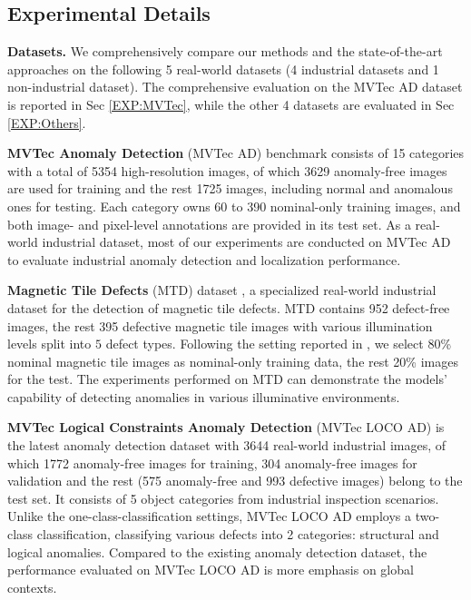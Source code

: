 \documentclass[default,iicol]{sn-jnl}\usepackage[algo2e,ruled,linesnumbered]{algorithm2e}
\theoremstyle{thmstyleone}\newtheorem{theorem}{Theorem}\newtheorem{proposition}[theorem]{Proposition}
\theoremstyle{thmstyletwo}\newtheorem{example}{Example}\newtheorem{remark}{Remark}
\theoremstyle{thmstylethree}\newtheorem{definition}{Definition}
\begin{document}
\subsection{Experimental Details}

\noindent\textbf{Datasets. }\label{sec:dataset}
We comprehensively compare our methods and the state-of-the-art approaches on the following 5 real-world datasets (4 industrial datasets and 1 non-industrial dataset).
The comprehensive evaluation on the MVTec AD dataset is reported in Sec \ref{EXP:MVTec}, while the other 4 datasets are evaluated in Sec \ref{EXP:Others}.

\textbf{MVTec Anomaly Detection} (MVTec AD) benchmark \cite{MVTEC} consists of 15 categories with a total of 5354 high-resolution images, of which 3629 anomaly-free images are used for training and the rest 1725 images, including normal and anomalous ones for testing.
Each category owns 60 to 390 nominal-only training images, and both image- and pixel-level annotations are provided in its test set.
As a real-world industrial dataset, most of our experiments are conducted on MVTec AD to evaluate industrial anomaly detection and localization performance.

\textbf{Magnetic Tile Defects} (MTD) dataset \cite{MTD}, a specialized real-world industrial dataset for the detection of magnetic tile defects.
MTD contains 952 defect-free images, the rest 395 defective magnetic tile images with various illumination levels split into $5$ defect types.
Following the setting reported in \cite{DifferNet}, we select 80\% nominal magnetic tile images as nominal-only training data, the rest 20\% images for the test.
The experiments performed on MTD can demonstrate the models' capability of detecting anomalies in various illuminative environments.

\textbf{MVTec Logical Constraints Anomaly Detection} (MVTec LOCO AD) \cite{MVTECLOCO} is the latest anomaly detection dataset with 3644 real-world industrial images, of which 1772 anomaly-free images for training, 304 anomaly-free images for validation and the rest (575 anomaly-free and 993 defective images) belong to the test set.
It consists of 5 object categories from industrial inspection scenarios.
Unlike the one-class-classification settings, MVTec LOCO AD employs a two-class classification, classifying various defects into 2 categories: structural and logical anomalies.
Compared to the existing anomaly detection dataset, the performance evaluated on MVTec LOCO AD is more emphasis on global contexts.
\end{document}
